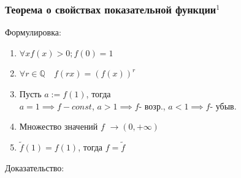 \documentclass{article}
\begin{document}
\subsubsection{Теорема о свойствах показательной функции\texorpdfstring{$^1$}{}}
Формулировка:
\begin{enumerate}
    \item $\forall x f(x) > 0; f(0) = 1$
    \item $\forall r \in \mathbb{Q} \quad f(rx) = (f(x))^r$
    \item Пусть $a:= f(1)$, тогда \\$a=1 \implies f-const$, $a > 1 \implies f \text{- возр.}$, $a < 1 \implies f \text{- убыв.}$
    \item Множество значений $f$ $\rightarrow (0, +\infty)$
    \item $\tilde f(1) = f(1)$, тогда $f = \tilde f$
\end{enumerate}
Доказательство:
\end{document}
